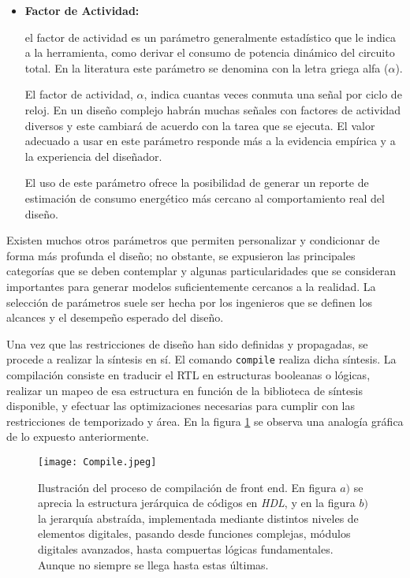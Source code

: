 \begin{itemize}
\item \textbf{Factor de Actividad:} {el factor de actividad es un parámetro generalmente estadístico que le indica a la herramienta, como derivar el consumo de potencia dinámico del circuito total. En la literatura este parámetro se denomina con la letra griega alfa (\textbf{$\alpha$}).

El factor de actividad, $\alpha$, indica cuantas veces conmuta una señal por ciclo de reloj. En un diseño complejo habrán muchas señales con factores de actividad diversos y este cambiará de acuerdo con la tarea que se ejecuta. El valor adecuado a usar en este parámetro responde más a la evidencia empírica y a la experiencia del diseñador.\cite{book:weste2005}

El uso de este parámetro ofrece la posibilidad de generar un reporte de estimación de consumo energético más cercano al comportamiento real del diseño.}
\end{itemize}

Existen muchos otros parámetros que permiten personalizar y condicionar de forma más profunda el diseño; no obstante, se expusieron las principales categorías que se deben contemplar y algunas particularidades que se consideran importantes para generar modelos suficientemente cercanos a la realidad. La selección de parámetros suele ser hecha por los ingenieros que se definen los alcances y el desempeño esperado del diseño.

Una vez que las restricciones de diseño han sido definidas y propagadas, se procede a realizar la síntesis en sí. El comando \texttt{compile} realiza dicha síntesis.
La compilación consiste en traducir el RTL en estructuras booleanas o lógicas, realizar un mapeo de esa estructura en función de la biblioteca de síntesis disponible, y efectuar las optimizaciones necesarias para cumplir con las restricciones de temporizado y área. En la figura \ref{comp} se observa una analogía gráfica de lo expuesto anteriormente.


\begin{figure}[h]
\texttt{[image: Compile.jpeg]}
\centering
\caption{Ilustración del proceso de compilación de front end. En figura \textbf{$a)$} se aprecia la estructura jerárquica de códigos en \textit{HDL}, y en la figura \textbf{$b)$} la jerarquía abstraída, implementada mediante distintos niveles de elementos digitales, pasando desde funciones complejas, módulos digitales avanzados, hasta compuertas lógicas fundamentales. Aunque no siempre se llega hasta estas últimas.}
\label{comp}
\end{figure}


